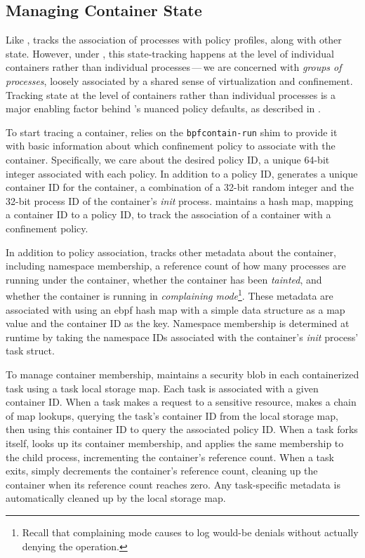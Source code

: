\subsection{Managing Container State}%
\label{ss:bpfcontain-state}

Like \bpfbox{}, \bpfcontain{} tracks the association of processes with policy profiles,
along with other state. However, under \bpfcontain{}, this state-tracking happens
at the level of individual containers rather than individual processes\,---\,we are
concerned with \textit{groups of processes}, loosely associated by a shared sense of
virtualization and confinement. Tracking state at the level of containers rather than
individual processes is a major enabling factor behind \bpfcontain{}'s nuanced policy
defaults, as described in .

To start tracing a container, \bpfcontain{} relies on the \texttt{bpfcontain-run} shim to
provide it with basic information about which confinement policy to associate with the
container. Specifically, we care about the desired policy ID, a unique 64-bit integer
associated with each \bpfcontain{} policy. In addition to a policy ID, \bpfcontain{}
generates a unique container ID for the container, a combination of a 32-bit random
integer and the 32-bit process ID of the container's \textit{init} process. \bpfcontain{}
maintains a hash map, mapping a container ID to a policy ID, to track the association of
a container with a confinement policy.

In addition to policy association, \bpfcontain{} tracks other metadata about the
container, including namespace membership, a reference count of how many processes are
running under the container, whether the container has been \textit{tainted}, and whether
the container is running in \textit{complaining mode}\footnote{Recall that complaining
mode causes \bpfcontain{} to log would-be denials without actually denying the
operation.}. These metadata are associated with using an \gls{ebpf} hash map with a simple
data structure as a map value and the container ID as the key. Namespace membership is
determined at runtime by taking the namespace IDs associated with the container's
\textit{init} process' task struct.

To manage container membership, \bpfcontain{} maintains a security blob in each
containerized task using a task local storage map. Each task is associated with a given
container ID. When a task makes a request to a sensitive resource, \bpfcontain{} makes
a chain of map lookups, querying the task's container ID from the local storage map, then
using this container ID to query the associated policy ID. When a task forks itself,
\bpfcontain{} looks up its container membership, and applies the same membership to the
child process, incrementing the container's reference count. When a task exits,
\bpfcontain{} simply decrements the container's reference count, cleaning up the container
when its reference count reaches zero. Any task-specific metadata is automatically cleaned
up by the local storage map.

